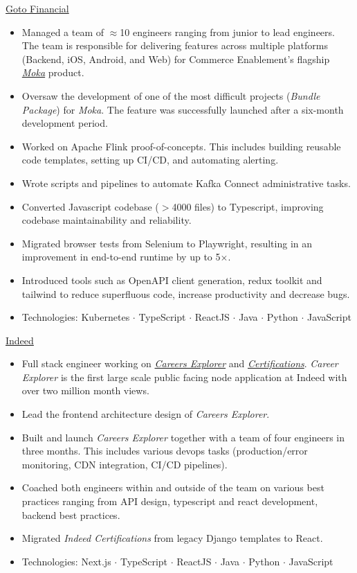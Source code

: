 \documentclass[]{cv} %
\begin{document}
\entry
{\href{https://gotofinancial.com/en}{Goto Financial}}
{
\begin{itemize}
\item Managed a team of $\approx$10 engineers ranging from junior to lead engineers. The team is responsible for delivering features across multiple platforms (Backend, iOS, Android, and Web) for Commerce Enablement's flagship \href{https://www.mokapos.com/en}{\emph{Moka}} product.
\item Oversaw the development of one of the most difficult projects (\emph{Bundle Package}) for \emph{Moka}. The feature was successfully launched after a six-month development period.
\item Worked on Apache Flink proof-of-concepts. This includes building reusable code templates, setting up CI/CD, and automating alerting.
\item Wrote scripts and pipelines to automate Kafka Connect administrative tasks.
\item Converted Javascript codebase ($> $4000 files) to Typescript, improving codebase maintainability and reliability.
\item Migrated browser tests from Selenium to Playwright, resulting in an improvement in end-to-end runtime by up to 5$\times$.
\item Introduced tools such as OpenAPI client generation, redux toolkit and tailwind to reduce superfluous code, increase productivity and decrease bugs.
\item Technologies: Kubernetes $\cdot$ TypeScript $\cdot$ ReactJS $\cdot$ Java $\cdot$ Python $\cdot$ JavaScript
\end{itemize}
}

\entry
{\href{https://www.indeed.com/}{Indeed}}
{
\begin{itemize}
\item Full stack engineer working on \href{https://www.indeed.com/career}{\emph{Careers Explorer}} and \href{https://www.indeed.com/certifications/}{\emph{Certifications}}. \emph{Career Explorer} is the first large scale public facing node application at Indeed with over two million month views.
\item Lead the frontend architecture design of \emph{Careers Explorer}.
\item Built and launch \emph{Careers Explorer} together with a team of four engineers in three months. This includes various devops tasks (production/error monitoring, CDN integration, CI/CD pipelines).
\item Coached both engineers within and outside of the team on various best practices ranging from API design, typescript and react development, backend best practices.
\item Migrated \emph{Indeed Certifications} from legacy Django templates to React.
\item Technologies: Next.js $\cdot$ TypeScript $\cdot$ ReactJS $\cdot$ Java $\cdot$ Python $\cdot$ JavaScript
\end{itemize}
}
\end{document}

